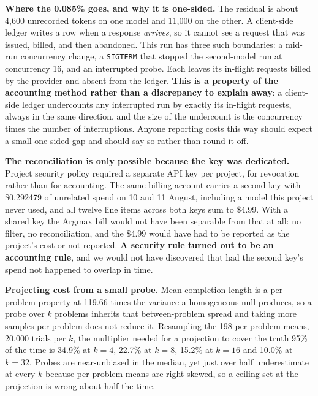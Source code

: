 \documentclass{article}
\begin{document}
\textbf{Where the 0.085\% goes, and why it is one-sided.} The residual is
about 4,600 unrecorded tokens on one model and 11,000 on the other. A
client-side ledger writes a row when a response \emph{arrives}, so it cannot
see a request that was issued, billed, and then abandoned. This run has three
such boundaries: a mid-run concurrency change, a \texttt{SIGTERM} that stopped
the second-model run at concurrency 16, and an interrupted probe. Each leaves
its in-flight requests billed by the provider and absent from the ledger.
\textbf{This is a property of the accounting method rather than a discrepancy
to explain away}: a client-side ledger undercounts any interrupted run by
exactly its in-flight requests, always in the same direction, and the size of
the undercount is the concurrency times the number of interruptions. Anyone
reporting costs this way should expect a small one-sided gap and should say so
rather than round it off.

\textbf{The reconciliation is only possible because the key was dedicated.}
Project security policy required a separate API key per project, for revocation
rather than for accounting. The same billing account carries a second key with
\$0.292479 of unrelated spend on 10 and 11 August, including a model this
project never used, and all twelve line items across both keys sum to \$4.99.
With a shared key the Argmax bill would not have been separable from that at
all: no filter, no reconciliation, and the \$4.99 would have had to be reported
as the project's cost or not reported. \textbf{A security rule turned out to be
an accounting rule}, and we would not have discovered that had the second key's
spend not happened to overlap in time.

\textbf{Projecting cost from a small probe.} Mean completion length is a
per-problem property at 119.66 times the variance a homogeneous null produces,
so a probe over $k$ problems inherits that between-problem spread and taking
more samples per problem does not reduce it. Resampling the 198 per-problem
means, 20,000 trials per $k$, the multiplier needed for a projection to cover
the truth 95\% of the time is 34.9\% at $k=4$, 22.7\% at $k=8$, 15.2\% at
$k=16$ and 10.0\% at $k=32$. Probes are near-unbiased in the median, yet just
over half underestimate at every $k$ because per-problem means are
right-skewed, so a ceiling set at the projection is wrong about half the time.




\end{document}
